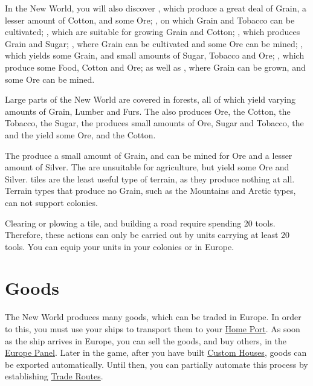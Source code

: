 \documentclass[12pt]{book}
\begin{document}
In the New World, you will also discover , which
produce a great deal of Grain, a lesser amount of Cotton, and some
Ore; , on which Grain and Tobacco can be
cultivated; , which are suitable for growing Grain
and Cotton; , which produces Grain and Sugar;
, where Grain can be cultivated and some Ore can be
mined; , which yields some Grain, and small amounts of
Sugar, Tobacco and Ore; , which produce some Food,
Cotton and Ore; as well as , where Grain can be grown,
and some Ore can be mined.

Large parts of the New World are covered in forests, all of which
yield varying amounts of Grain, Lumber and Furs. The  also produces Ore, the  Cotton, the
 Tobacco, the  Sugar,
the  produces small amounts of Ore, Sugar and
Tobacco, the  and the 
yield some Ore, and the  Cotton.

The  produce a small amount of Grain, and can be mined
for Ore and a lesser amount of Silver. The  are
unsuitable for agriculture, but yield some Ore and Silver.
 tiles are the least useful type of terrain, as they
produce nothing at all. Terrain types that produce no Grain, such as
the Mountains and Arctic types, can not support colonies.

Clearing or plowing a tile, and building a road require spending 20
tools. Therefore, these actions can only be carried out by units
carrying at least 20 tools. You can equip your units in your colonies
or in Europe.

\hypertarget{Goods}{\section{Goods}}

The New World produces many goods, which can be traded in Europe. In
order to this, you must use your ships to transport them to your
\hyperlink{Home Port}{Home Port}. As soon as the ship arrives in
Europe, you can sell the goods, and buy others, in the
\hyperlink{europe panel}{Europe Panel}. Later in the game, after you
have built \hyperlink{Custom House}{Custom Houses}, goods can be
exported automatically. Until then, you can partially automate this
process by establishing \hyperlink{Trade Routes}{Trade Routes}.
\end{document}

